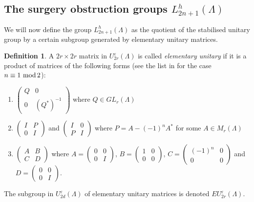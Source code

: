 \documentclass[11pt,a4paper,leqno]{amsart}
\theoremstyle{definition}
\newtheorem{definition}[theorem]{Definition}
\theoremstyle{remark}
\renewcommand{\mod}{\,\,\text{\normalfont mod}\,}
\renewcommand{\l}{\Lambda}
\newcommand{\La}{\Lambda}
\newcommand{\U}{U^{\varepsilon}}
\newcommand{\EU}{EU^{\varepsilon}}
\begin{document}
\subsection{The surgery obstruction groups  $L^h_{2n+1}(\La)$} We will now define the group $L^h_{2n+1}(\La)$ as the quotient of the stabilised unitary group by a certain subgroup generated by elementary unitary matrices.
\begin{definition}\label{def:elemU}
A $2r\times 2r$ matrix in $\U_{2r}(\l)$ is called \emph{elementary unitary} if it is a product of matrices
of the following forms  (see the list in \cite[\S 1]{Lee:1971} for the case $n \equiv 1 \mod 2$):

\begin{enumerate}
\item $\left(\begin{smallmatrix} Q & 0 \\ 0 & (Q^*)^{-1} \end{smallmatrix}\right)$ where $Q \in GL_r(\l)$
\item $\left(\begin{smallmatrix} I & P \\ 0 & I \end{smallmatrix}\right)$ and $\left(\begin{smallmatrix} I & 0 \\ P & I \end{smallmatrix}\right)$ where $P = A - (-1)^nA^*$ for some $A \in M_r(\l)$
\item $\left(\begin{smallmatrix} A & B \\ C & D \end{smallmatrix}\right)$ where 
$A=\left(\begin{smallmatrix} 0 & 0 \\ 0 & I \end{smallmatrix}\right)$, 
$B=\left(\begin{smallmatrix} 1 & 0 \\ 0 & 0 \end{smallmatrix}\right)$, 
$C=\left(\begin{smallmatrix} (-1)^n & 0 \\ 0 & 0 \end{smallmatrix}\right)$ and 
$D=\left(\begin{smallmatrix} 0 & 0 \\ 0 & I \end{smallmatrix}\right)$.
\end{enumerate}
The subgroup in $\U_{2d}(\La)$ of elementary unitary matrices is denoted $\EU_{2r}(\La)$.
\end{definition}
\end{document}
